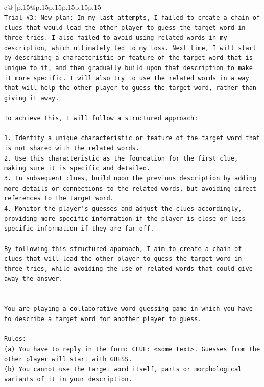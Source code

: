 \documentclass{article}
\begin{document}
{\begin{supertabular}{c@{$\;$}|p{.15\linewidth}@{}p{.15\linewidth}p{.15\linewidth}p{.15\linewidth}p{.15\linewidth}p{.15\linewidth}}
{{{\\ 
\texttt{Trial \#3: New plan: In my last attempts, I failed to create a chain of clues that would lead the other player to guess the target word in three tries. I also failed to avoid using related words in my description, which ultimately led to my loss. Next time, I will start by describing a characteristic or feature of the target word that is unique to it, and then gradually build upon that description to make it more specific. I will also try to use the related words in a way that will help the other player to guess the target word, rather than giving it away. } \\
\\ 
\texttt{To achieve this, I will follow a structured approach:} \\
\\ 
\texttt{1. Identify a unique characteristic or feature of the target word that is not shared with the related words.} \\
\texttt{2. Use this characteristic as the foundation for the first clue, making sure it is specific and detailed.} \\
\texttt{3. In subsequent clues, build upon the previous description by adding more details or connections to the related words, but avoiding direct references to the target word.} \\
\texttt{4. Monitor the player's guesses and adjust the clues accordingly, providing more specific information if the player is close or less specific information if they are far off.} \\
\\ 
\texttt{By following this structured approach, I aim to create a chain of clues that will lead the other player to guess the target word in three tries, while avoiding the use of related words that could give away the answer.} \\
\\ 
\\ 
\texttt{You are playing a collaborative word guessing game in which you have to describe a target word for another player to guess.} \\
\\ 
\texttt{Rules:} \\
\texttt{(a) You have to reply in the form: CLUE: <some text>. Guesses from the other player will start with GUESS.} \\
\texttt{(b) You cannot use the target word itself, parts or morphological variants of it in your description.} \\
}}}
\end{supertabular}}
\end{document}
